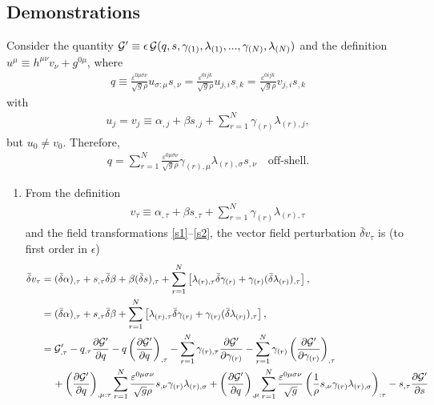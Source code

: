 \documentclass{article}
\numberwithin{equation}{section}
\begin{document}
\begin{appendices}
\section{Demonstrations}\label{demo}
Consider the quantity ${\cal G}' \equiv \epsilon\,{\cal G}(q,s,\gamma_{(1)},\lambda_{(1)},...,\gamma_{(N)},\lambda_{(N)})$ and the definition $u^\mu \equiv h^{\mu\nu}v_\nu+g^{0\mu}$, where
\begin{align}
q \equiv \frac{\varepsilon^{0\mu\sigma\nu}}{\sqrt{g}\rho} u_{\sigma:\mu} s_{,\nu}=\frac{\varepsilon^{0ijk}}{\sqrt{g}\rho} u_{j,i} s_{,k} = \frac{\varepsilon^{0ijk}}{\sqrt{g}\rho} v_{j,i} s_{,k}
\end{align}
with
\begin{align}
u_j=v_j \equiv \alpha_{,j}+\beta s_{,j}+\sum_{r=1}^N \gamma_{(r)}\lambda_{(r),j},
\end{align}
but $u_0 \ne v_0$. Therefore,
\begin{align}
q=\sum_{r=1}^N\frac{\varepsilon^{0\mu\sigma\nu}}{\sqrt{g}\rho} \gamma_{(r),\mu}\lambda_{(r),\sigma} s_{,\nu} \quad\text{off-shell.}
\end{align}
\begin{enumerate}[leftmargin=*]
\item From the definition
\begin{align}
v_\tau \equiv \alpha_{,\tau}+\beta s_{,\tau}+\sum_{r=1}^N \gamma_{(r)}\lambda_{(r),\tau}
\end{align}
and the field transformations \eqref{s1}--\eqref{s2}, the vector field perturbation $\bar\delta v_\tau$ is (to first order in $\epsilon$)
\begin{align}
\bar\delta v_\tau &= (\bar\delta\alpha)_{,\tau}+s_{,\tau} \bar\delta\beta+\beta(\bar\delta s)_{,\tau} + \sum_{r=1}^N \left[ \lambda_{(r),\tau} \bar\delta\gamma_{(r)} + \gamma_{(r)}(\bar\delta\lambda_{(r)})_{,\tau}\right], \nonumber \\
&= (\bar\delta\alpha)_{,\tau}+s_{,\tau} \bar\delta\beta+ \sum_{r=1}^N \left[ \lambda_{(r),\tau} \bar\delta\gamma_{(r)} + \gamma_{(r)}(\bar\delta\lambda_{(r)})_{,\tau}\right], \nonumber \\
&= {\cal G}'_{,\tau}-q_{,\tau} \frac{\partial{\cal G}'}{\partial q}-q\left( \frac{\partial{\cal G}'}{\partial q} \right)_{,\tau} - \sum_{r=1}^N \gamma_{(r),\tau} \frac{\partial{\cal G}'}{\partial \gamma_{(r)}}-\sum_{r=1}^N \gamma_{(r)} \left(\frac{\partial{\cal G}'}{\partial \gamma_{(r)}}\right)_{,\tau} \nonumber \\
&\quad\, + \left(\frac{\partial{\cal G}'}{\partial q}\right)_{,\mu:\tau} \sum_{r=1}^N \frac{\varepsilon^{0\mu\sigma\nu}}{\sqrt{g}\rho} s_{,\nu} \gamma_{(r)}\lambda_{(r),\sigma} +\left(\frac{\partial{\cal G}'}{\partial q}\right)_{,\mu} \sum_{r=1}^N \frac{\varepsilon^{0\mu\sigma\nu}}{\sqrt{g}} \left(\frac{1}{\rho}s_{,\nu} \gamma_{(r)}\lambda_{(r),\sigma}\right)_{:\tau}-s_{,\tau} \frac{\partial{\cal G}'}{\partial s} \nonumber \\

\end{align}
\end{enumerate}
\end{appendices}
\end{document}
